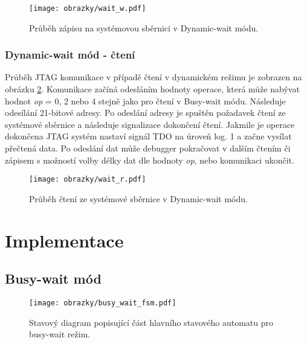 \begin{figure}[!h]
  \begin{center}
    \texttt{[image: obrazky/wait\_w.pdf]}
  \end{center}
  \caption{Průběh zápisu na systémovou sběrnici v Dynamic-wait módu.}
	\label{fig:wait_w}
\end{figure}

\subsubsection{Dynamic-wait mód - čtení} 
Průběh JTAG komunikace v případě čtení v dynamickém režimu je zobrazen na obrázku \ref{fig:wait_r}. Komunikace začíná odesláním hodnoty operace, která může nabývat hodnot \textit{op} = 0, 2 nebo 4 stejně jako pro čtení v Busy-wait módu. Následuje odesílání 21-bitové adresy. Po odeslání adresy je spuštěn požadavek čtení ze systémové sběrnice a následuje signalizace dokončení čtení. Jakmile je operace dokončena \acs{JTAG} systém nastaví signál \acs{TDO} na úroveň log. 1 a začne vysílat přečtená data. Po odeslání dat může debugger pokračovat v dalším čtením či zápisem s možností volby délky dat dle hodnoty \textit{op}, nebo komunikaci ukončit. 

\begin{figure}[!h]
  \begin{center}
    \texttt{[image: obrazky/wait\_r.pdf]}
  \end{center}
  \caption{Průběh čtení ze systémové sběrnice v Dynamic-wait módu.}
	\label{fig:wait_r}
\end{figure}

\section{Implementace}

\subsection{Busy-wait mód} 

\begin{figure}[!h]
  \begin{center}
    \texttt{[image: obrazky/busy\_wait\_fsm.pdf]}
  \end{center}
  \caption{Stavový diagram popisující část hlavního stavového automatu pro busy-wait režim.}
	\label{fig:busy_wait_fsm}
\end{figure}